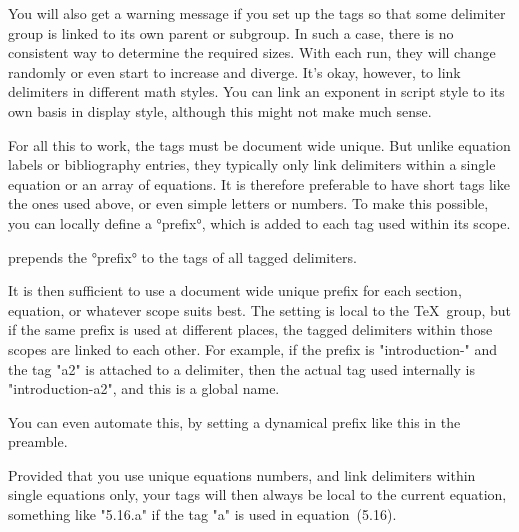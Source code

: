 \documentclass{longmath-doc}
\begin{document}
You will also get a warning message if you set up the tags so that some delimiter group is linked to its own parent or subgroup. In such a case, there is no consistent way to determine the required sizes. With each run, they will change randomly or even start to increase and diverge. It's okay, however, to link delimiters in different math styles. You can link an exponent in script style to its own basis in display style, although this might not make much sense.

For all this to work, the tags must be document wide unique. But unlike equation labels or bibliography entries, they typically only link delimiters within a single equation or an array of equations. It is therefore preferable to have short tags like the ones used above, or even simple letters or numbers. To make this possible, you can locally define a °prefix°, which is added to each tag used within its scope. 

 prepends the °prefix° to the tags of all tagged delimiters. 

It is then sufficient to use a document wide unique prefix for each section, equation, or whatever scope suits best. The setting is local to the \TeX\ group, but if the same prefix is used at different places, the tagged delimiters within those scopes are linked to each other. For example, if the prefix is "introduction-" and the tag "a2" is attached to a delimiter, then the actual tag used internally is "introduction-a2", and this is a global name. 

You can even automate this, by setting a dynamical prefix like this in the preamble.  
\begin{code*}
\end{code*}
Provided that you use unique equations numbers, and link delimiters within single equations only, your tags will then always be local to the current equation, something like "5.16.a" if the tag "a" is used in equation~(5.16). 
\end{document}
